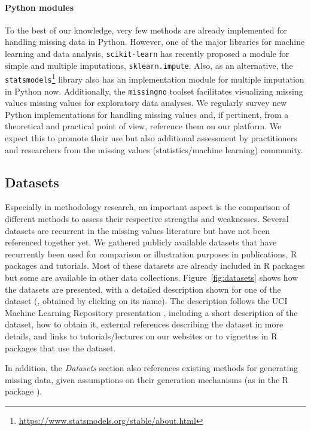 \paragraph*{{Python} modules}

To the best of our knowledge, very few methods are already implemented for handling missing data in {Python}. However, one of the major libraries for machine learning and data analysis, \texttt{scikit-learn} \citep{pedregosa2011scikit} has recently proposed a module for simple and multiple imputations, \texttt{sklearn.impute}. Also, as an alternative, the \texttt{statsmodels}\footnote{\url{https://www.statsmodels.org/stable/about.html}} library also has an implementation module for multiple imputation in {Python} now. Additionally, the \texttt{missingno} toolset \citep{Bilogur2018} facilitates visualizing missing values missing values for exploratory data analyses. We regularly survey new {Python} implementations for handling missing values and, if pertinent, from a theoretical and practical point of view, reference them on our platform. We expect this to promote their use but also additional assessment by practitioners and researchers from the missing values (statistics/machine learning) community.

\subsection{Datasets}

Especially in methodology research, an important aspect is the comparison of
different methods to assess their respective strengths and weaknesses. Several datasets
are recurrent in the missing values literature but have not been referenced together yet. We gathered publicly
available datasets that have recurrently been used for comparison or
illustration purposes in publications, {R} packages and tutorials. Most of these
datasets are already included in {R} packages but some are available in other
data collections. Figure~\ref{fig:datasets} shows how the datasets are
presented, with a detailed description shown for one of the dataset (,
obtained by clicking on its name). The description follows the UCI Machine
Learning Repository presentation \citep{dua_2019}, including a short
description of the dataset, how to obtain it, external references describing
the dataset in more details, and links to tutorials/lectures on our websites or
to vignettes in {R} packages that use the dataset.

In addition, the \textit{Datasets} section also references existing methods for generating missing data, given assumptions on their generation
mechanisms (as in the {R} package ). 

